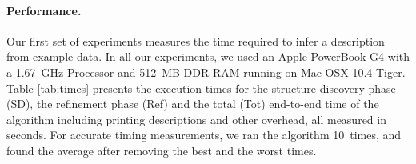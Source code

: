 
\paragraph*{Performance.}
Our first set of experiments measures the time required to infer a description
from example data.  In all our experiments, we used an 
Apple PowerBook G4 with a 1.67~GHz Processor and 512~MB DDR RAM 
running on Mac OSX 10.4 Tiger. Table \ref{tab:times} presents the execution times
for the structure-discovery phase (SD), the refinement phase (Ref) and the
total (Tot) end-to-end time of the algorithm including printing \pads{} descriptions and other 
overhead, all measured in seconds.  For accurate timing measurements, we ran the algorithm
10~times, and found the average after removing the best and the worst times.

